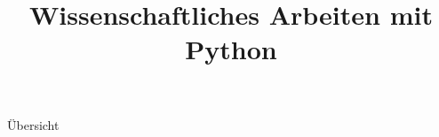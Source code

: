 

\title[Python]{Wissenschaftliches Arbeiten mit Python}



{
  \begin{frame}
    \titlepage
  \end{frame}
}

\begin{frame}{Übersicht}
  \tableofcontents
\end{frame}




